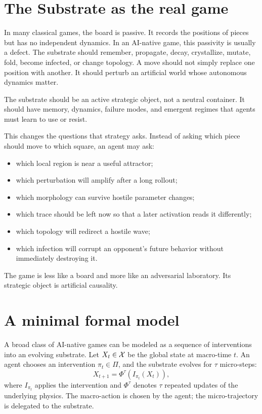 \section{The Substrate as the real game}\label{sec:substrate}

In many classical games, the board is passive. It records the positions of pieces but has no independent dynamics. In an AI-native game, this passivity is usually a defect. The substrate should remember, propagate, decay, crystallize, mutate, fold, become infected, or change topology. A move should not simply replace one position with another. It should perturb an artificial world whose autonomous dynamics matter.

\begin{principle}\label{prin:substrate-primacy}
The substrate should be an active strategic object, not a neutral container. It should have memory, dynamics, failure modes, and emergent regimes that agents must learn to use or resist.
\end{principle}

This changes the questions that strategy asks. Instead of asking which piece should move to which square, an agent may ask:
\begin{itemize}
  \item which local region is near a useful attractor;
  \item which perturbation will amplify after a long rollout;
  \item which morphology can survive hostile parameter changes;
  \item which trace should be left now so that a later activation reads it differently;
  \item which topology will redirect a hostile wave;
  \item which infection will corrupt an opponent's future behavior without immediately destroying it.
\end{itemize}

The game is less like a board and more like an adversarial laboratory. Its strategic object is artificial causality.

\section{A minimal formal model}\label{sec:model}

A broad class of AI-native games can be modeled as a sequence of interventions into an evolving substrate. Let $X_t\in\mathcal{X}$ be the global state at macro-time $t$. An agent chooses an intervention $\pi_t\in\Pi$, and the substrate evolves for $\tau$ micro-steps:
\[
  X_{t+1} = \Phi^\tau(I_{\pi_t}(X_t)),
\]
where $I_{\pi_t}$ applies the intervention and $\Phi^\tau$ denotes $\tau$ repeated updates of the underlying physics. The macro-action is chosen by the agent; the micro-trajectory is delegated to the substrate.

